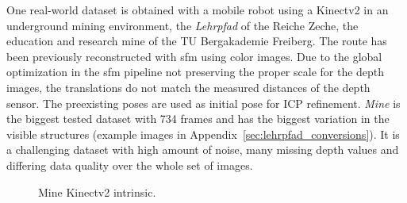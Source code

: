 One real-world dataset is obtained with a mobile robot using a Kinectv2 in an underground mining environment, the \emph{Lehrpfad} of the Reiche Zeche, the education and research mine of the TU Bergakademie Freiberg.
The route has been previously reconstructed with \gls{sfm} using color images.
Due to the global optimization in the \gls{sfm} pipeline not preserving the proper scale for the depth images, the translations do not match the measured distances of the depth sensor.
The preexisting poses are used as initial pose for ICP refinement.
\emph{Mine} is the biggest tested dataset with 734 frames and has the biggest variation in the visible structures (example images in Appendix~\ref{sec:lehrpfad_conversions}).
It is a challenging dataset with high amount of noise, many missing depth values and differing data quality over the whole set of images.
\begin{figure}[H]
\CenterFloatBoxes%
\begin{floatrow}
    {\caption{Mine Kinectv2 intrinsic.}\label{tab:lehrpfad_intrinsic}}%
\end{floatrow}
\end{figure}
